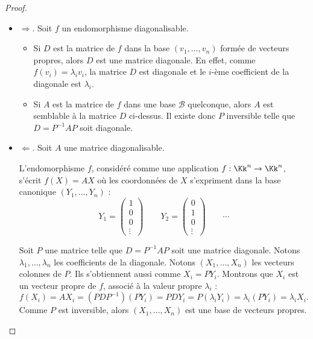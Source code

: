 \documentclass[12pt, class=report,crop=false]{standalone}
\begin{document}
\begin{proof}~
\begin{itemize}
\item $\Longrightarrow$. Soit $f$ un endomorphisme diagonalisable.
\begin{itemize}
  \item Si $D$ est la matrice de $f$ dans la base $(v_1,\ldots,v_n)$ formée de vecteurs propres, alors
  $D$ est une matrice diagonale. En effet, comme $f(v_i) = \lambda_i v_i$, la matrice $D$ est diagonale et le $i$-ème coefficient de la diagonale est $\lambda_i$.

  \item Si $A$ est la matrice de $f$ dans une base $\mathcal{B}$ quelconque, alors $A$ est semblable à la matrice $D$ ci-dessus. Il existe donc $P$ inversible telle que $D = P^{-1}AP$ soit diagonale.
\end{itemize}

\item $\Longleftarrow$. Soit $A$ une matrice diagonalisable.

L'endomorphisme $f$, considéré comme une application $f : \Kk^n \to \Kk^n$, s'écrit $f(X)=AX$ où les coordonnées de $X$ s'expriment dans la base canonique
$(Y_1,\ldots,Y_n)$ :
$$Y_1 = \left(\begin{smallmatrix}1\\0\\0\\\vdots\end{smallmatrix}\right) \qquad
Y_2 = \left(\begin{smallmatrix}0\\1\\0\\\vdots\end{smallmatrix}\right) \qquad \cdots$$

Soit $P$ une matrice telle que $D = P^{-1}AP$ soit une matrice diagonale. Notons
$\lambda_1,\ldots,\lambda_n$ les coefficients de la diagonale.
Notons $(X_1,\ldots,X_n)$ les vecteurs colonnes de $P$.
Ils s'obtiennent aussi comme $X_i = P Y_i$.
Montrons que $X_i$ est un vecteur propre de $f$, associé à la valeur propre $\lambda_i$ :
$$f(X_i) = AX_i = (PDP^{-1})(P Y_i) = PD Y_i = P (\lambda_i Y_i) = \lambda_i (P Y_i) = \lambda_i X_i.$$
Comme $P$ est inversible, alors $(X_1,\ldots,X_n)$ est une base de vecteurs propres.
\end{itemize}
\end{proof}
\end{document}
